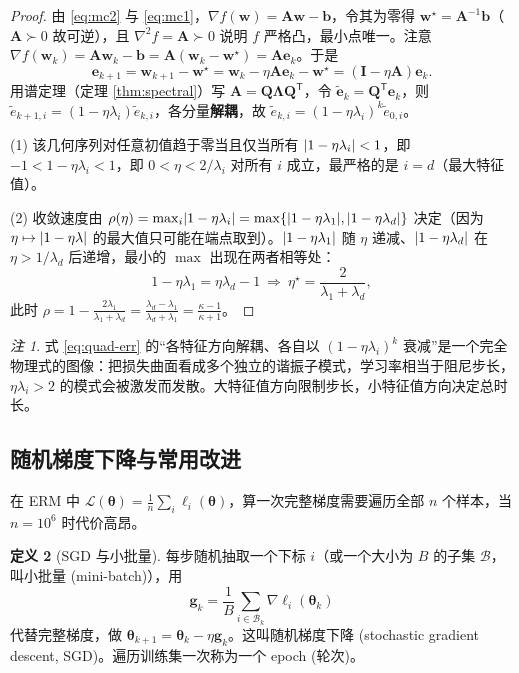 \documentclass[UTF8,a4paper,11pt]{ctexart}
\theoremstyle{definition}
\newtheorem{definition}{定义}[section]
\theoremstyle{plain}
\theoremstyle{remark}
\newtheorem{remark}[definition]{注}
\DeclarePairedDelimiter{\abs}{\lvert}{\rvert}
\newcommand{\Loss}{\mathcal{L}}
\newcommand{\T}{^{\mathsf{T}}}
\newcommand{\eng}[1]{\textup{(#1)}}
\begin{document}
\begin{proof}
由 \eqref{eq:mc2} 与 \eqref{eq:mc1}，$\nabla f(\bm{w})=\bm{A}\bm{w}-\bm{b}$，令其为零得 $\bm{w}^\star=\bm{A}^{-1}\bm{b}$（$\bm{A}\succ0$ 故可逆），且 $\nabla^2f=\bm{A}\succ0$ 说明 $f$ 严格凸，最小点唯一。注意 $\nabla f(\bm{w}_k)=\bm{A}\bm{w}_k-\bm{b}=\bm{A}(\bm{w}_k-\bm{w}^\star)=\bm{A}\bm{e}_k$。于是
\[
  \bm{e}_{k+1}=\bm{w}_{k+1}-\bm{w}^\star=\bm{w}_k-\eta\bm{A}\bm{e}_k-\bm{w}^\star=(\bm{I}-\eta\bm{A})\bm{e}_k .
\]
用谱定理（定理 \ref{thm:spectral}）写 $\bm{A}=\bm{Q}\bm{\Lambda}\bm{Q}\T$，令 $\tilde{\bm{e}}_k=\bm{Q}\T\bm{e}_k$，则 $\tilde e_{k+1,i}=(1-\eta\lambda_i)\tilde e_{k,i}$，各分量\textbf{解耦}，故 $\tilde e_{k,i}=(1-\eta\lambda_i)^k\tilde e_{0,i}$。

(1) 该几何序列对任意初值趋于零当且仅当所有 $\abs{1-\eta\lambda_i}<1$，即 $-1<1-\eta\lambda_i<1$，即 $0<\eta<2/\lambda_i$ 对所有 $i$ 成立，最严格的是 $i=d$（最大特征值）。

(2) 收敛速度由 $\rho(\eta)=\max_i\abs{1-\eta\lambda_i}=\max\{\abs{1-\eta\lambda_1},\abs{1-\eta\lambda_d}\}$ 决定（因为 $\eta\mapsto\abs{1-\eta\lambda}$ 的最大值只可能在端点取到）。$\abs{1-\eta\lambda_1}$ 随 $\eta$ 递减、$\abs{1-\eta\lambda_d}$ 在 $\eta>1/\lambda_d$ 后递增，最小的 $\max$ 出现在两者相等处：
\[
  1-\eta\lambda_1=\eta\lambda_d-1\ \Longrightarrow\ \eta^\star=\frac{2}{\lambda_1+\lambda_d},
\]
此时 $\rho=1-\frac{2\lambda_1}{\lambda_1+\lambda_d}=\frac{\lambda_d-\lambda_1}{\lambda_d+\lambda_1}=\frac{\kappa-1}{\kappa+1}$。
\end{proof}

\begin{remark}
式 \eqref{eq:quad-err} 的“各特征方向解耦、各自以 $(1-\eta\lambda_i)^k$ 衰减”是一个完全物理式的图像：把损失曲面看成多个独立的谐振子模式，学习率相当于阻尼步长，$\eta\lambda_i>2$ 的模式会被激发而发散。大特征值方向限制步长，小特征值方向决定总时长。
\end{remark}

\subsection{随机梯度下降与常用改进}

在 ERM 中 $\Loss(\bm{\theta})=\frac1n\sum_i\ell_i(\bm{\theta})$，算一次完整梯度需要遍历全部 $n$ 个样本，当 $n=10^6$ 时代价高昂。

\begin{definition}[SGD 与小批量]\label{def:sgd}
每步随机抽取一个下标 $i$（或一个大小为 $B$ 的子集 $\mathcal{B}$，叫小批量 \eng{mini-batch}），用
\[
  \bm{g}_k=\frac{1}{B}\sum_{i\in\mathcal{B}_k}\nabla\ell_i(\bm{\theta}_k)
\]
代替完整梯度，做 $\bm{\theta}_{k+1}=\bm{\theta}_k-\eta\bm{g}_k$。这叫随机梯度下降 \eng{stochastic gradient descent, SGD}。遍历训练集一次称为一个 epoch \eng{轮次}。
\end{definition}
\end{document}
